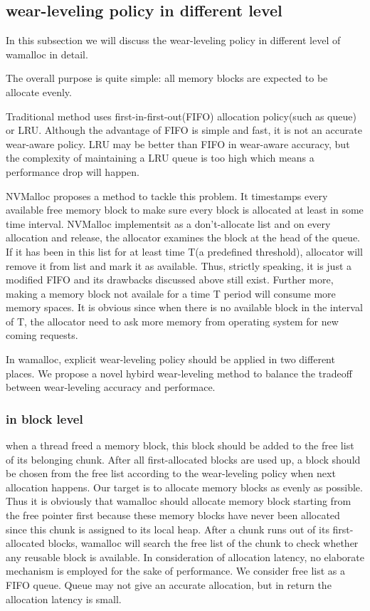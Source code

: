 \documentclass{vldb}
\begin{document}
\subsection{wear-leveling policy in different level}

In this subsection we will discuss the wear-leveling policy in different level of wamalloc in detail.

The overall purpose is quite simple: all memory blocks are expected to be allocate evenly.

Traditional method uses first-in-first-out(FIFO) allocation policy(such as queue) or LRU\cite{zhou2009durable}\cite{rodriguez2015write}.
Although the advantage of FIFO is simple and fast, it is not an accurate wear-aware policy.
LRU may be better than FIFO in wear-aware accuracy, but the complexity of maintaining a LRU queue is too high which means a performance drop will happen.

NVMalloc\cite{moraru2013consistent} proposes a method to tackle this problem.
It timestamps every available free memory block to make sure every block is allocated at least in some time interval. NVMalloc implementsit as a don't-allocate list and on every allocation and release, the allocator examines the block at the head of the queue.
If it has been in this list for at least time T(a predefined threshold), allocator will remove it from list and mark it as available.
Thus, strictly speaking, it is just a modified FIFO and its drawbacks discussed above still exist.
Further more, making a memory block not availale for a time T period will consume more memory spaces. It is obvious since when there is no available block in the interval of T, the allocator need to ask more memory from operating system for new coming requests.


In wamalloc, explicit wear-leveling policy should be applied in two different places. 
We propose a novel hybird wear-leveling method to balance the tradeoff between wear-leveling accuracy and performace.

\subsubsection{in block level}
when a thread freed a memory block, this block should be added to the free list of its belonging chunk.
After all first-allocated blocks are used up, a block should be chosen from the free list according to the wear-leveling policy when next allocation happens.
Our target is to allocate memory blocks as evenly as possible.
Thus it is obviously that wamalloc should allocate memory block starting from the free pointer first
because these memory blocks have never been allocated since this chunk is assigned to its local heap.
After a chunk runs out of its first-allocated blocks, wamalloc will search the free list of the chunk to check whether any reusable block is available.
In consideration of allocation latency, no elaborate mechanism is employed for the sake of performance.
We consider free list as a FIFO queue. Queue may not give an accurate allocation, but in return the allocation latency is small.
\end{document}
